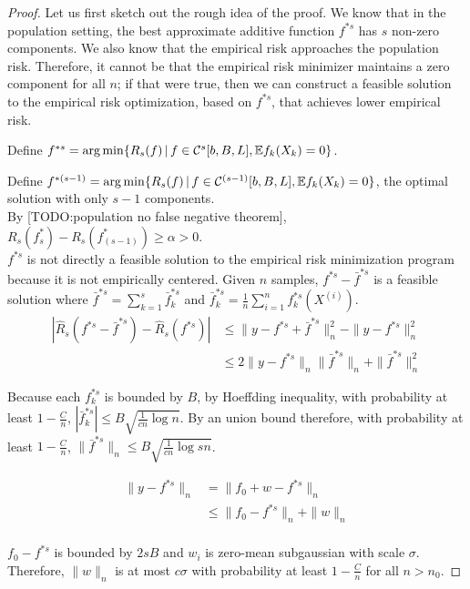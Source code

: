 \documentclass{article}
\begin{document}
\begin{proof}
Let us first sketch out the rough idea of the proof. We know that in the population setting, the best approximate additive function $f^{*s}$ has $s$ non-zero components. We also know that the empirical risk approaches the population risk. Therefore, it cannot be that the empirical risk minimizer maintains a zero component for all $n$; if that were true, then we can construct a feasible solution to the empirical risk optimization, based on $f^{*s}$, that achieves lower empirical risk. 

Define $f^{*s} = \arg\min \{ R_s(f) \,|\, f \in \mathcal{C}^s[b,B,L], \mathbb{E} f_k(X_k) = 0\}$.

Define $f^{*(s-1)} = \arg\min \{ R_s(f) \,|\, f \in \mathcal{C}^{(s-1)}[b,B,L], \mathbb{E} f_k(X_k) = 0\}$, the optimal solution with only $s-1$ components.\\

By [TODO:population no false negative theorem], $R_s(f^*_s) - R_s(f^*_{(s-1)}) \geq \alpha > 0$.\\

$f^{*s}$ is not directly a feasible solution to the empirical risk minimization program because it is not empirically centered. Given $n$ samples, $f^{*s} - \bar{f}^{*s}$ is a feasible solution where $\bar{f}^{*s} = \sum_{k=1}^s \bar{f}_k^{*s}$ and $\bar{f}_k^{*s} = \frac{1}{n} \sum_{i=1}^n f_k^{*s}(X^{(i)})$. \\

\begin{align*}
|\hat{R}_s(f^{*s} - \bar{f}^{*s}) - \hat{R}_s(f^{*s})| &\leq \| y - f^{*s} + \bar{f}^{*s} \|_n^2  - \| y - f^{*s}\|_n^2 \\
	&\leq 2\|y-f^{*s}\|_n \|\bar{f}^{*s}\|_n + \|\bar{f}^{*s}\|_n^2 
\end{align*}

Because each $f_k^{*s}$ is bounded by $B$, by Hoeffding inequality, with probability at least $1-\frac{C}{n}$, $|\bar{f}_k^{*s}| \leq B\sqrt{\frac{1}{cn} \log n}$. By an union bound therefore, with probability at least $1-\frac{C}{n}$, $\|\bar{f}^{*s}\|_n \leq B\sqrt{\frac{1}{cn} \log sn}$.

\begin{align*}
\| y - f^{*s} \|_n &= \| f_0 + w - f^{*s} \|_n \\
	&\leq \| f_0 - f^{*s} \|_n + \|w\|_n \\
\end{align*}

$f_0 - f^{*s}$ is bounded by $2sB$ and $w_i$ is zero-mean subgaussian with scale $\sigma$. Therefore, $\|w\|_n$ is at most $c\sigma$ with probability at least $1-\frac{C}{n}$ for all $n > n_0$. 


\end{proof}
\end{document}
